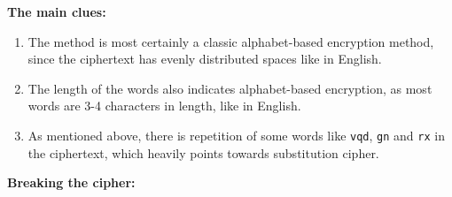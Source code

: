 \documentclass[11pt]{article}
\begin{document}
\textbf{The main clues: }
\begin{enumerate}
  \item The method is most certainly a classic alphabet-based encryption method, since the ciphertext has evenly distributed spaces like in English.
  \item The length of the words also indicates alphabet-based encryption, as most words are 3-4 characters in length, like in English.
  \item As mentioned above, there is repetition of some words like \texttt{vqd}, \texttt{gn} and \texttt{rx} in the ciphertext, which heavily points towards substitution cipher.
\end{enumerate}

\pagebreak

\textbf{Breaking the cipher: }
\end{document}
